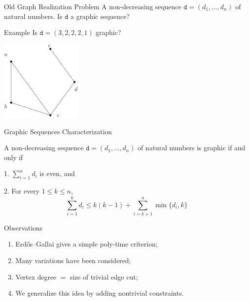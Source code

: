 \begin{frame}{Old Graph Realization Problem}
    {A non-decreasing sequence $\texttt{d} = (d_1, \dots, d_n)$ of natural numbers.}
    {Is $\texttt{d}$ a graphic sequence?}
\end{frame}

\begin{frame}{Example}
  \centering
  Is $\texttt{d}=(3, 2, 2, 2, 1)$ graphic?
  \pause
  \bigbreak
  \begin{minipage}{\linewidth}
    \centering
    \includegraphics[height=4cm]{images/real1.png}
  \end{minipage}
\end{frame}

\begin{frame}{Graphic Sequences Characterization}
  \begin{theorem}
    A non-decreasing sequence $\texttt{d} = (d_1, \dots, d_n)$ of natural numbers is graphic if and only if \bigbreak
    \pause
    
    1. $\sum\limits_{i=1}^n d_i$ is even, and \medskip
    \pause

    2. For every $1 \le k \le n$,
        \[
        \sum_{i=1}^k d_i \le k(k - 1) + \sum_{i=k+1}^n \min\{d_i, k\}
        \]
  \end{theorem}
\end{frame}

\begin{frame}{Observations}
    \begin{enumerate}[-]
        \item Erd\H{o}s–Gallai gives a simple poly-time criterion;
        
        \item Many variations have been considered; 
        
        \item Vertex degree $=$ size of trivial edge cut;
        
        \item We generalize this idea by adding nontrivial constraints.
    \end{enumerate}
\end{frame}
